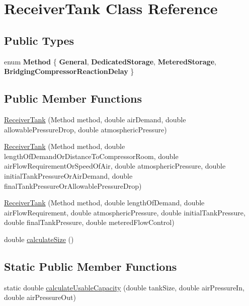 \hypertarget{class_receiver_tank}{}\section{Receiver\+Tank Class Reference}
\label{class_receiver_tank}
\subsection*{Public Types}
\begin{DoxyCompactItemize}
\item 
\mbox{\label{class_receiver_tank_a8abbc7bc7f04ab853e1334c8905e5832}} 
enum {\bfseries Method} \{ {\bfseries General}, 
{\bfseries Dedicated\+Storage}, 
{\bfseries Metered\+Storage}, 
{\bfseries Bridging\+Compressor\+Reaction\+Delay}
 \}
\end{DoxyCompactItemize}
\subsection*{Public Member Functions}
\begin{DoxyCompactItemize}
\item 
\hyperlink{class_receiver_tank_ad41df65fb570224e135eae7b16c15b81}{Receiver\+Tank} (Method method, double air\+Demand, double allowable\+Pressure\+Drop, double atmospheric\+Pressure)
\item 
\hyperlink{class_receiver_tank_a499e102ca118bfe3bdff3584310207c2}{Receiver\+Tank} (Method method, double length\+Of\+Demand\+Or\+Distance\+To\+Compressor\+Room, double air\+Flow\+Requirement\+Or\+Speed\+Of\+Air, double atmospheric\+Pressure, double initial\+Tank\+Pressure\+Or\+Air\+Demand, double final\+Tank\+Pressure\+Or\+Allowable\+Pressure\+Drop)
\item 
\hyperlink{class_receiver_tank_aba0ca17714d1009c79d6dfcfaa3cea6a}{Receiver\+Tank} (Method method, double length\+Of\+Demand, double air\+Flow\+Requirement, double atmospheric\+Pressure, double initial\+Tank\+Pressure, double final\+Tank\+Pressure, double metered\+Flow\+Control)
\item 
double \hyperlink{class_receiver_tank_a5841344b63c444e4ceb9c3b7daeaf613}{calculate\+Size} ()
\end{DoxyCompactItemize}
\subsection*{Static Public Member Functions}
\begin{DoxyCompactItemize}
\item 
static double \hyperlink{class_receiver_tank_acf0ee7d8a77b01d8c39105c22fbba342}{calculate\+Usable\+Capacity} (double tank\+Size, double air\+Pressure\+In, double air\+Pressure\+Out)
\end{DoxyCompactItemize}


